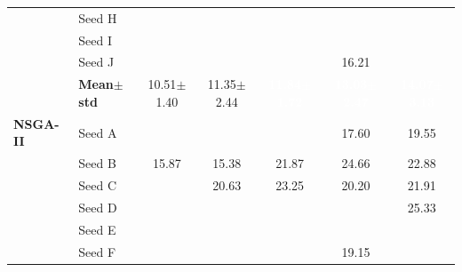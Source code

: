 \begin{table}[H]
{\begin{tabular}{@{}llccccc@{}}
  & Seed H & \cellcolor{RoyalBlue!10}{\small 10.80} & \cellcolor{RoyalBlue!10}{\small 13.41} & \cellcolor{RoyalBlue!10}{\small 11.69} & \cellcolor{RoyalBlue!10}{\small 12.62} & \cellcolor{RoyalBlue!10}{\small 13.28} \\
  & Seed I & \cellcolor{RoyalBlue!10}{\small 11.59} & \cellcolor{RoyalBlue!10}{\small 13.66} & \cellcolor{RoyalBlue!10}{\small 13.72} & \cellcolor{RoyalBlue!10}{\small 12.07} & \cellcolor{RoyalBlue!10}{\small 13.83} \\
  & Seed J & \cellcolor{RoyalBlue!10}{\small 11.12} & \cellcolor{RoyalBlue!10}{\small 11.98} & \cellcolor{RoyalBlue!10}{\small 11.74} & {\small\color{gray!60!black}16.21} & \cellcolor{RoyalBlue!10}{\small 14.08} \\
 & \textbf{Mean$\pm$std} & \cellcolor{RoyalBlue!20}10.51$\pm$1.40 & \cellcolor{RoyalBlue!20}11.35$\pm$2.44 & \cellcolor{RoyalBlue!65}\textcolor{white}{\textbf{11.84$\pm$1.72}} & \cellcolor{RoyalBlue!65}\textcolor{white}{\textbf{13.03$\pm$2.47}} & \cellcolor{RoyalBlue!65}\textcolor{white}{\textbf{14.07$\pm$3.13}} \\
\midrule
 \textbf{NSGA-II} & Seed A & \cellcolor{RoyalBlue!10}{\small 10.12} & \cellcolor{RoyalBlue!10}{\small 12.11} & \cellcolor{RoyalBlue!10}{\small 13.32} & {\small\color{gray!60!black}17.60} & {\small\color{gray!60!black}19.55} \\
  & Seed B & {\small\color{gray!60!black}15.87} & {\small\color{gray!60!black}15.38} & {\small\color{gray!60!black}21.87} & {\small\color{gray!60!black}24.66} & {\small\color{gray!60!black}22.88} \\
  & Seed C & \cellcolor{RoyalBlue!10}{\small 14.99} & {\small\color{gray!60!black}20.63} & {\small\color{gray!60!black}23.25} & {\small\color{gray!60!black}20.20} & {\small\color{gray!60!black}21.91} \\
  & Seed D & \cellcolor{RoyalBlue!10}{\small 5.68} & \cellcolor{RoyalBlue!10}{\small 12.39} & \cellcolor{RoyalBlue!10}{\small 10.17} & \cellcolor{RoyalBlue!10}{\small 11.59} & {\small\color{gray!60!black}25.33} \\
  & Seed E & \cellcolor{RoyalBlue!10}{\small 6.72} & \cellcolor{RoyalBlue!10}{\small 7.78} & \cellcolor{RoyalBlue!10}{\small 9.18} & \cellcolor{RoyalBlue!10}{\small 12.11} & \cellcolor{RoyalBlue!10}{\small 12.72} \\
  & Seed F & \cellcolor{RoyalBlue!10}{\small 7.00} & \cellcolor{RoyalBlue!10}{\small 7.58} & \cellcolor{RoyalBlue!10}{\small 9.11} & {\small\color{gray!60!black}19.15} & \cellcolor{RoyalBlue!10}{\small 14.83} \\

\end{tabular}}
\end{table}
